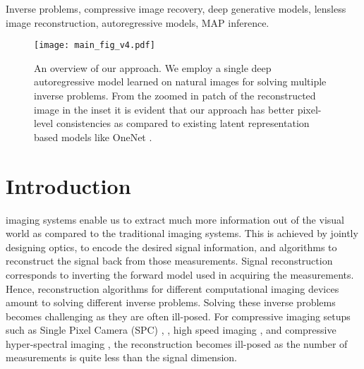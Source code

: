 \documentclass[journal,twoside]{IEEEtran}
\begin{document}
\begin{IEEEkeywords}
Inverse problems, compressive image recovery, deep generative models, lensless image reconstruction,  autoregressive models, MAP inference.
\end{IEEEkeywords}






\IEEEpeerreviewmaketitle

\begin{figure*}
    \centering
    \texttt{[image: main\_fig\_v4.pdf]}
    \caption{An overview of our approach. We employ a single deep autoregressive model learned on natural images for solving multiple inverse problems. From the zoomed in patch of the reconstructed image in the inset it is evident that our approach has better pixel-level consistencies as compared to existing latent representation based models like OneNet \cite{chang2017one}.}
    \label{fig:main_fig}
\end{figure*}

\section{Introduction}

 imaging systems enable us to extract much more information out of the visual world as compared to the traditional imaging systems. This is achieved by jointly designing optics, to encode the desired signal information, and algorithms to reconstruct the signal back from those measurements. Signal reconstruction corresponds to inverting the forward model used in acquiring the measurements. Hence, reconstruction algorithms for different computational imaging devices amount to solving different inverse problems. Solving these inverse problems becomes challenging as they are often ill-posed. For  compressive imaging setups such as Single Pixel Camera (SPC) \cite{duarte2008single}, \cite{wang2015lisens}, high speed imaging \cite{reddy2011p2c2},  \cite{hitomi2011video} and compressive hyper-spectral imaging \cite{wagadarikar2008single}, the reconstruction becomes ill-posed as the number of measurements is quite less than the signal dimension. %
\end{document}
